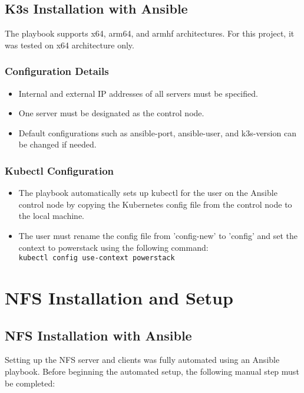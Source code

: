 \subsection{K3s Installation with Ansible}

The playbook supports x64, arm64, and armhf architectures. For this project, it was tested on x64 architecture only.

\subsubsection{Configuration Details}
\begin{itemize}
    \item Internal and external IP addresses of all servers must be specified.
    \item One server must be designated as the control node.
    \item Default configurations such as ansible-port, ansible-user, and k3s-version can be changed if needed.
\end{itemize}

\subsubsection{Kubectl Configuration}
\begin{itemize}
    \item The playbook automatically sets up kubectl for the user on the Ansible control node by copying the Kubernetes config file from the control node to the local machine.
    \item The user must rename the config file from 'config-new' to 'config' and set the context to powerstack using the following command:\\
    \texttt{kubectl config use-context powerstack}
\end{itemize}

\section{NFS Installation and Setup}

\subsection{NFS Installation with Ansible}

Setting up the NFS server and clients was fully automated using an Ansible playbook. Before beginning the automated setup, the following manual step must be completed:

